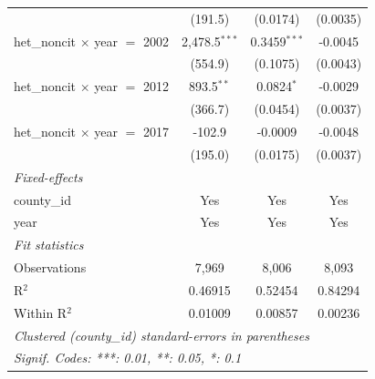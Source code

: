 \begin{tabular}{lccc}
                                                    & (191.5)                          & (0.0174)                     & (0.0035)\\   
   het\_noncit $\times$ year $=$ 2002               & 2,478.5$^{***}$                  & 0.3459$^{***}$               & -0.0045\\   
                                                    & (554.9)                          & (0.1075)                     & (0.0043)\\   
   het\_noncit $\times$ year $=$ 2012               & 893.5$^{**}$                     & 0.0824$^{*}$                 & -0.0029\\   
                                                    & (366.7)                          & (0.0454)                     & (0.0037)\\   
   het\_noncit $\times$ year $=$ 2017               & -102.9                           & -0.0009                      & -0.0048\\   
                                                    & (195.0)                          & (0.0175)                     & (0.0037)\\   
   \midrule
   \emph{Fixed-effects}\\
   county\_id                                       & Yes                              & Yes                          & Yes\\  
   year                                             & Yes                              & Yes                          & Yes\\  
   \midrule
   \emph{Fit statistics}\\
   Observations                                     & 7,969                            & 8,006                        & 8,093\\  
   R$^2$                                            & 0.46915                          & 0.52454                      & 0.84294\\  
   Within R$^2$                                     & 0.01009                          & 0.00857                      & 0.00236\\  
   \midrule \midrule
   \multicolumn{4}{l}{\emph{Clustered (county\_id) standard-errors in parentheses}}\\
   \multicolumn{4}{l}{\emph{Signif. Codes: ***: 0.01, **: 0.05, *: 0.1}}\\
\end{tabular}
\par\endgroup


